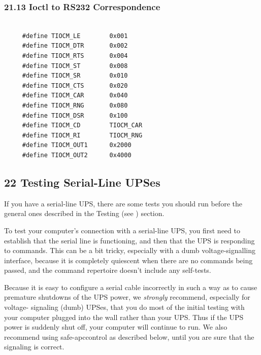 \label{Ioctl-to-RS232-Correspondence}

\subsubsection*{21.13 Ioctl to RS232 Correspondence}

\label{index-Cables-218}

\footnotesize
\begin{verbatim}
     
     #define TIOCM_LE        0x001
     #define TIOCM_DTR       0x002
     #define TIOCM_RTS       0x004
     #define TIOCM_ST        0x008
     #define TIOCM_SR        0x010
     #define TIOCM_CTS       0x020
     #define TIOCM_CAR       0x040
     #define TIOCM_RNG       0x080
     #define TIOCM_DSR       0x100
     #define TIOCM_CD        TIOCM_CAR
     #define TIOCM_RI        TIOCM_RNG
     #define TIOCM_OUT1      0x2000
     #define TIOCM_OUT2      0x4000
\end{verbatim}
\normalsize

\label{Testing-Serial_002dLine-UPSes}

\subsection*{22 Testing Serial-Line UPSes}

\label{index-Testing_002c-Serial-219}
\label{index-Serial_002c-Testing-220}
If you have a serial-line UPS, there are some tests you should run before the
general ones described in the Testing (see 
) section.  

To test your computer's connection with a serial-line UPS, you first need to
establish that the serial line is functioning, and then that the UPS is
responding to commands.  This can be a bit tricky, especially with a dumb
voltage-signalling interface, because it is completely quiescent when there
are no commands being passed, and the command repertoire doesn't include any
self-tests.  

Because it is easy to configure a serial cable incorrectly in such a way as to
cause premature shutdowns of the UPS power, we {\it strongly} recommend,
especially for voltage- signaling (dumb) UPSes, that you do most of the
initial testing with your computer plugged into the wall rather than your UPS.
Thus if the UPS power is suddenly shut off, your computer will continue to
run. We also recommend using safe-apccontrol as described below, until you are
sure that the signaling is correct.  

